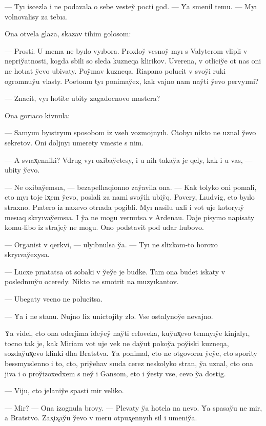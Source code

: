 \documentclass[10pt]{book}
\begin{document}
— Tyı iscezla i ne podavala o sebe vestey̆ pocti god. — Y̆a smenil temu. — Myı volnovalisy za tebıa.

Ona otvela glaza, skazav tihim golosom:

— Prosti. U menıa ne byılo vyıbora. Proxloy̆ vesnoy̆ myı s Valyterom vlipli v nepriy̆atnosti, kogda sbili so sleda kuzneqa klirikov. Uverena, v otliciy̆e ot nas oni ne hotıat y̆evo ubivaty. Poy̆mav kuzneqa, Riapano polucit v svoy̆i ruki ogromnuy̆u vlasty. Poetomu tyı ponimay̆ex, kak vajno nam nay̆ti y̆evo pervyımi?

— Znacit, vyı hotite ubity zagadocnovo mastera?

Ona gorıaco kivnula:

— Samyım byıstryım sposobom iz vseh vozmojnyıh. Ctobyı nikto ne uznal y̆evo sekretov. Oni doljnyı umerety vmeste s nim.

— A svıax̨enniki? Vdrug vyı oxibay̆etesy, i u nih takay̆a je qely, kak i u vas, — ubity y̆evo.

— Ne oxibay̆emsıa, — bezapellıaqionno zay̆avila ona. — Kak tolyko oni ponıali, cto myı toje ix̨em y̆evo, poslali za nami svoy̆ih ubiy̆q. Povery, Lıudvig, eto byılo straxno. Pıatero iz naxevo otrıada pogibli. Myı nasilu uxli i vot uje kotoryıy̆ mesıaq skryıvay̆emsıa. I y̆a ne mogu vernutsa v Ardenau. Daje pisymo napisaty komu-libo iz strajey̆ ne mogu. Ono podstavit pod udar lıubovo.

— Organist v qerkvi, — ulyıbnulsa y̆a. — Tyı ne slixkom-to horoxo skryıvay̆exysa.

— Lucxe prıatatsa ot sobaki v y̆ey̆e je budke. Tam ona budet iskaty v poslednıuy̆u oceredy. Nikto ne smotrit na muzyıkantov.

— Ubegaty vecno ne polucitsa.

— Y̆a i ne stanu. Nujno lix unictojity zlo. Vse ostalynoy̆e nevajno.

Y̆a videl, cto ona oderjima idey̆ey̆ nay̆ti celoveka, kuy̆ux̨evo temnyıy̆e kinjalyı, tocno tak je, kak Miriam vot uje vek ne day̆ut pokoy̆a poy̆iski kuzneqa, sozday̆ux̨evo klinki dlıa Bratstva. Y̆a ponimal, cto ne otgovorıu y̆ey̆e, cto spority bessmyıslenno i to, cto, priy̆ehav sıuda cerez neskolyko stran, y̆a uznal, cto ona jiva i o proy̆izoxedxem s ney̆ i Gansom, eto i y̆esty vse, cevo y̆a dostig.

— Viju, cto jelaniy̆e spasti mir veliko.

— Mir? — Ona izognula brovy. — Plevaty y̆a hotela na nevo. Y̆a spasay̆u ne mir, a Bratstvo. Zax̨ix̨ay̆u y̆evo v meru otpux̨ennyıh sil i umeniy̆a.
\end{document}

